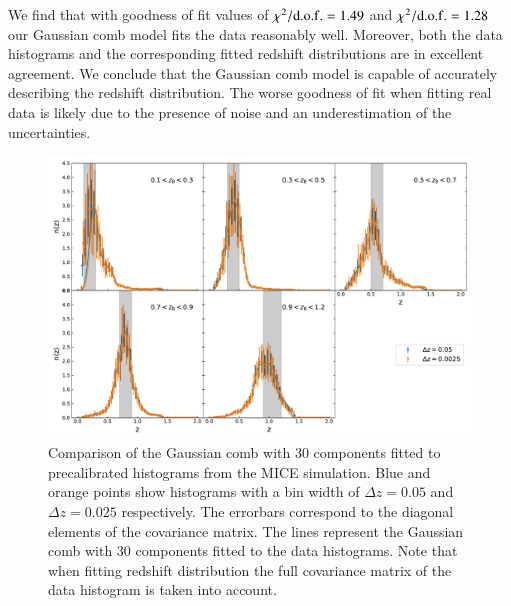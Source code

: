 \documentclass{aa}
\begin{document}
\begin{appendix}
We find that with goodness of fit values of $\chi^2/{\rm d.o.f.} = 1.49$ and $\chi^2/{\rm d.o.f.} = 1.28$ our Gaussian comb model fits the data reasonably well. Moreover, both the data histograms and the corresponding fitted redshift distributions are in excellent agreement. We conclude that the Gaussian comb model is capable of accurately describing the redshift distribution. The worse goodness of fit when fitting real data is likely due to the presence of noise and an underestimation of the uncertainties. 
\begin{figure}
\centering
\includegraphics[width=\linewidth]{plots/calibration_MICE.pdf}
\caption{Comparison of the Gaussian comb with 30 components fitted to precalibrated histograms from the MICE simulation. Blue and orange points show histograms with a bin width of $\Delta z = 0.05$ and $\Delta z = 0.025$ respectively. The errorbars correspond to the diagonal elements of the covariance matrix. The lines represent the Gaussian comb with 30 components fitted to the data histograms. Note that when fitting redshift distribution the full covariance matrix of the data histogram is taken into account.}
\label{fig:MICE}
\end{figure}

\end{appendix}
\end{document}
